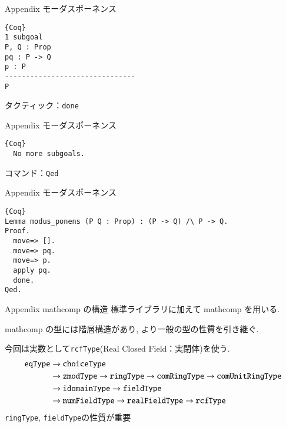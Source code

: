 \documentclass[dvipdfmx,cjk]{beamer}
\theoremstyle{mystyle}
\newcommand{\0}{\textbf{0}}
\begin{document}
\begin{frame}[fragile]{Appendix モーダスポーネンス}
	\begin{screen}
	  \begin{lstlisting}{Coq}
1 subgoal
P, Q : Prop
pq : P -> Q
p : P
-------------------------------
P \end{lstlisting}
	\end{screen} \pause
	タクティック：{\tt done}
\end{frame}

\begin{frame}[fragile]{Appendix モーダスポーネンス}
	\begin{screen}
	  \begin{lstlisting}{Coq}
  No more subgoals. \end{lstlisting}
	\end{screen} \pause
	コマンド：{\tt Qed}
\end{frame}

\begin{frame}[fragile]{Appendix モーダスポーネンス}
	\begin{lstlisting}{Coq}
Lemma modus_ponens (P Q : Prop) : (P -> Q) /\ P -> Q.
Proof.
  move=> [].
  move=> pq.
  move=> p.
  apply pq.
  done.
Qed. \end{lstlisting}
\end{frame}

\begin{frame}{Appendix mathcomp の構造}
	標準ライブラリ\cite{coq sl}に加えて mathcomp \cite{coq mc}を用いる. \pause
	
	mathcomp の型には階層構造があり, より一般の型の性質を引き継ぐ. \pause
	
	今回は実数として{\tt rcfType}(Real Closed Field：実閉体)を使う. \pause
	\begin{align*}
		{\tt eqType} &\to {\tt choiceType} \\
		                  &\to {\tt zmodType} \to {\tt ringType} \to 
		                          {\tt comRingType} \to {\tt comUnitRingType}\\
							  &\to {\tt idomainType} \to {\tt fieldType}\\
		                  &\to {\tt numFieldType} \to {\tt realFieldType} \to {\tt rcfType}
	\end{align*} \pause
	{\tt ringType}, {\tt fieldType}の性質が重要
\end{frame}
\end{document}

